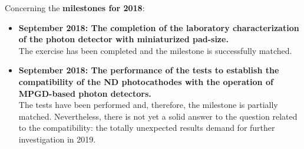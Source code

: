 Concerning the 
\textbf{milestones for 2018}:
\begin{itemize}
\item
\textbf{September 2018: The completion of the laboratory 
characterization 
of the photon detector with miniaturized pad-size.}\\
The exercise has been completed and the milestone is
successfully matched.
\item
\textbf{September 2018: 
The performance of the tests to establish the 
compatibility of the ND photocathodes with the
operation of MPGD-based photon detectors.}\\
The tests have been performed and, therefore, the
milestone is partially matched. Nevertheless, there is
not yet a solid answer to the question related to the
compatibility:  
the totally
unexpected results demand 
for further investigation in 2019.
\end{itemize}